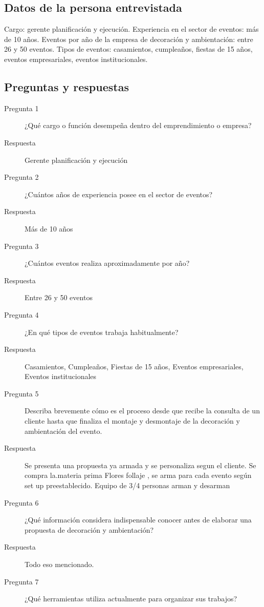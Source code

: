 \subsection{Datos de la persona entrevistada}

Cargo: gerente planificación y ejecución. Experiencia en el sector de eventos: más de 10 años. Eventos por año de la empresa de decoración y ambientación: entre 26 y 50 eventos. Tipos de eventos: casamientos, cumpleaños, fiestas de 15 años, eventos empresariales, eventos institucionales.

\subsection{Preguntas y respuestas}

\begin{description}
    \item[Pregunta 1] ¿Qué cargo o función desempeña dentro del emprendimiento o empresa?
    \item[Respuesta] Gerente planificación y ejecución
    \item[Pregunta 2] ¿Cuántos años de experiencia posee en el sector de eventos?
    \item[Respuesta] Más de 10 años
    \item[Pregunta 3] ¿Cuántos eventos realiza aproximadamente por año?
    \item[Respuesta] Entre 26 y 50 eventos
    \item[Pregunta 4] ¿En qué tipos de eventos trabaja habitualmente?
    \item[Respuesta] Casamientos, Cumpleaños, Fiestas de 15 años, Eventos empresariales, Eventos institucionales
    \item[Pregunta 5] Describa brevemente cómo es el proceso desde que recibe la consulta de un cliente hasta que finaliza el montaje y desmontaje de la decoración y ambientación del evento.
    \item[Respuesta] Se presenta una propuesta ya armada y se personaliza segun el cliente. Se compra la.materia prima Flores follaje , se arma para cada evento según set up preestablecido. Equipo de 3/4 personas arman y desarman
    \item[Pregunta 6] ¿Qué información considera indispensable conocer antes de elaborar una propuesta de decoración y ambientación?
    \item[Respuesta] Todo eso mencionado.
    \item[Pregunta 7] ¿Qué herramientas utiliza actualmente para organizar sus trabajos?

\end{description}
